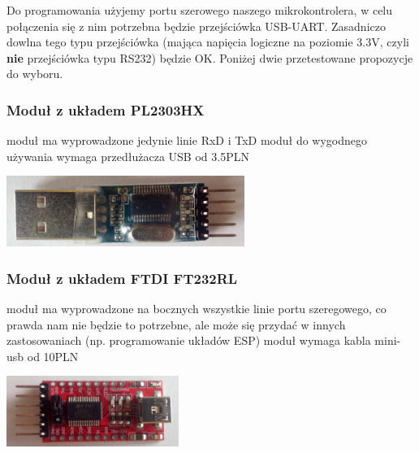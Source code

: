 Do programowania użyjemy portu szerowego naszego mikrokontrolera, w celu połączenia się z nim potrzebna będzie przejściówka USB-UART. Zasadniczo dowlna tego typu przejściówka (mająca napięcia logiczne na poziomie 3.3V, czyli \textbf{nie} przejściówka typu RS232) będzie OK. Poniżej dwie przetestowane propozycje do wyboru.

\subsubsection{Moduł z układem PL2303HX}
\parbox[c]{0.55\textwidth}{
	\begin{itemize}
		\wada moduł ma wyprowadzone jedynie linie RxD i TxD
		\wada moduł do wygodnego używania wymaga przedłużacza USB
		\info od 3.5PLN
	\end{itemize}
}
\parbox[c]{0.43\textwidth}{
	\begin{flushright} \includegraphics[height=2.3cm]{warsztat_elektroniczny/usb-uart1} \end{flushright}
}

\subsubsection{Moduł z układem FTDI FT232RL}
\parbox[c]{0.65\textwidth}{
	\begin{itemize}
		\zaleta moduł ma wyprowadzone na bocznych wszystkie linie portu szeregowego, co prawda nam nie będzie to potrzebne, ale może się przydać w innych zastosowaniach (np. programowanie układów ESP)
		\wada moduł wymaga kabla mini-usb
		\info od 10PLN
	\end{itemize}
}
\parbox[c]{0.33\textwidth}{
	\begin{flushright} \includegraphics[height=2.3cm]{warsztat_elektroniczny/usb-uart2} \end{flushright}
}
